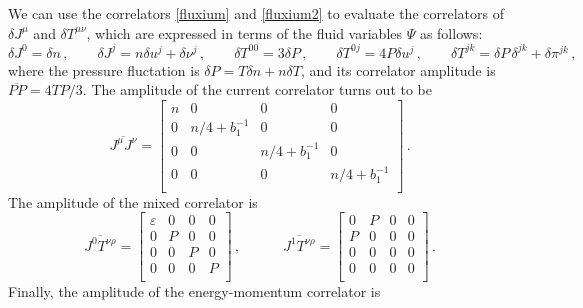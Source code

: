 \documentclass[aps,prd,preprint,nofootinbib,amsmath,amssymb,showpacs,longbibliography,singlecolumn,superscriptaddress,10pt]{revtex4-1}
\theoremstyle{plain}
\theoremstyle{definition}
\begin{document}
We can use the correlators \eqref{fluxium} and \eqref{fluxium2} to evaluate the correlators of $\delta J^\mu$ and $\delta T^{\mu \nu}$, which are expressed in terms of the fluid variables $\Psi$ as follows:
\begin{equation}
    \delta J^0=\delta n \, , \quad \quad \delta J^j=n\delta u^j +\delta \nu^j \, , \quad \quad \delta T^{00}=3\delta P \, , \quad \quad \delta T^{0j}=4P\delta u^j \, , \quad \quad \delta T^{jk}=\delta P\, \delta^{jk}+\delta \pi^{jk} \, ,
\end{equation}
where the pressure fluctation is $\delta P=T\delta n+n\delta T$, and its correlator amplitude is $\overline{PP}=4TP/3$. The amplitude of the current correlator turns out to be
\begin{equation}
    \overline{J^\mu J^\nu}=
    \begin{bmatrix}
n & 0 & 0 & 0 \\
0 & n/4{+}b_1^{-1} & 0 & 0 \\
0 & 0 & n/4{+}b_1^{-1} & 0 \\
0 & 0 & 0 & n/4{+}b_1^{-1} \\
    \end{bmatrix} \, .
\end{equation}
The amplitude of the mixed correlator is
\begin{equation}
    \overline{J^0 T^{\nu \rho}}=
    \begin{bmatrix}
\varepsilon & 0 & 0 & 0 \\
0 & P & 0 & 0 \\
0 & 0 & P & 0 \\
0 & 0 & 0 & P \\
    \end{bmatrix} \, , \quad \quad \quad 
    \overline{J^1 T^{\nu \rho}}=
    \begin{bmatrix}
0 & P & 0 & 0 \\
P & 0 & 0 & 0 \\
0 & 0 & 0 & 0 \\
0 & 0 & 0 & 0 \\
    \end{bmatrix} \, .  
\end{equation}
Finally, the amplitude of the energy-momentum correlator is
\end{document}
